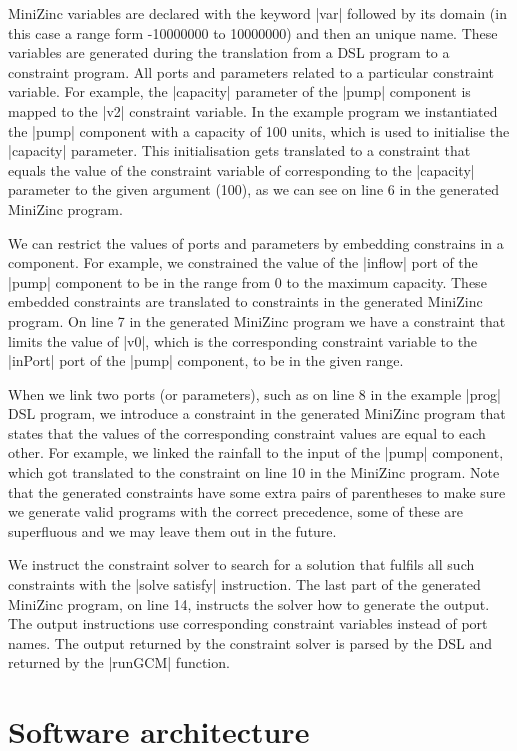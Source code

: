 \documentclass{article}
\begin{document}
MiniZinc variables are declared with the keyword |var| followed by its domain
(in this case a range form -10000000 to 10000000) and then an unique name. These
variables are generated during the translation from a DSL program to a
constraint program. All ports and parameters related to a particular constraint
variable. For example, the |capacity| parameter of the |pump| component is
mapped to the |v2| constraint variable. In the example program we instantiated
the |pump| component with a capacity of 100 units, which is used to initialise the
|capacity| parameter. This initialisation gets translated to a constraint that
equals the value of the constraint variable of corresponding to the |capacity| 
parameter to the given argument (100), as we can see on line 6 in the generated
MiniZinc program.

We can restrict the values of ports and parameters by embedding constrains in a
component. For example, we constrained the value of the |inflow| port of the
|pump| component to be in the range from 0 to the maximum capacity. These
embedded constraints are translated to constraints in the generated MiniZinc
program. On line 7 in the generated MiniZinc program we have a constraint that
limits the value of |v0|, which is the corresponding constraint variable to the
|inPort| port of the |pump| component, to be in the given range.


When we link two ports (or parameters), such as on line 8 in the
example |prog| DSL program, we introduce a constraint in the generated MiniZinc
program that states that the values of the corresponding constraint values
are equal to each other. For example, we linked the rainfall to the input of
the |pump| component, which got translated to the constraint on line 10 in the
MiniZinc program. Note that the generated constraints have some extra pairs of
parentheses to make sure we generate valid programs with the correct precedence,
some of these are superfluous and we may leave them out in the future.

We instruct the constraint solver to search for a solution that fulfils all such
constraints with the |solve satisfy| instruction. The last part of the generated
MiniZinc program, on line 14, instructs the solver how to generate the output.
The output instructions use corresponding constraint variables instead of port
names. The output returned by the constraint solver is parsed by the DSL and 
returned by the |runGCM| function.


\section{Software architecture}
\label{sec:architecture}
\end{document}
